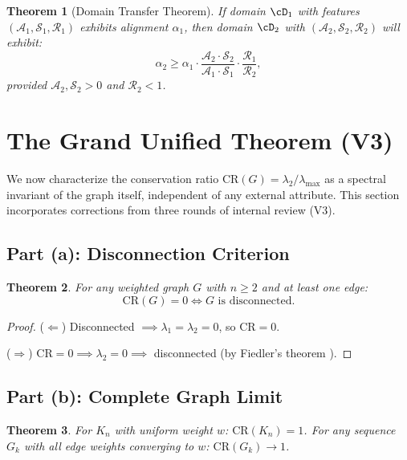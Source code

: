 \documentclass[12pt,letterpaper]{article}
\newtheorem{theorem}{Theorem}[section]
\newcommand{\CR}{\mathrm{CR}}
\newcommand{\cA}{\mathcal{A}}
\newcommand{\cS}{\mathcal{S}}
\newcommand{\cR}{\mathcal{R}}
\begin{document}
\begin{theorem}[Domain Transfer Theorem]
\label{thm:transfer}
If domain $\cD_1$ with features $(\cA_1, \cS_1, \cR_1)$ exhibits alignment $\alpha_1$, then domain $\cD_2$ with $(\cA_2, \cS_2, \cR_2)$ will exhibit:
\begin{equation}
\alpha_2 \geq \alpha_1 \cdot \frac{\cA_2 \cdot \cS_2}{\cA_1 \cdot \cS_1} \cdot \frac{\cR_1}{\cR_2},
\end{equation}
provided $\cA_2, \cS_2 > 0$ and $\cR_2 < 1$.
\end{theorem}

\section{The Grand Unified Theorem (V3)}
\label{sec:grand-unified}

We now characterize the conservation ratio $\CR(G) = \lambda_2/\lambda_{\max}$ as a spectral invariant of the graph itself, independent of any external attribute. This section incorporates corrections from three rounds of internal review (V3).

\subsection{Part (a): Disconnection Criterion}

\begin{theorem}
\label{thm:GUT-a}
For any weighted graph $G$ with $n \geq 2$ and at least one edge:
\[
  \CR(G) = 0 \iff G \text{ is disconnected.}
\]
\end{theorem}

\begin{proof}
($\Leftarrow$) Disconnected $\implies \lambda_1 = \lambda_2 = 0$, so $\CR = 0$.

($\Rightarrow$) $\CR = 0 \implies \lambda_2 = 0 \implies$ disconnected (by Fiedler's theorem \citep{fiedler1973}).
\end{proof}

\subsection{Part (b): Complete Graph Limit}

\begin{theorem}
\label{thm:GUT-b}
For $K_n$ with uniform weight $w$: $\CR(K_n) = 1$. For any sequence $G_k$ with all edge weights converging to $w$: $\CR(G_k) \to 1$.
\end{theorem}
\end{document}
